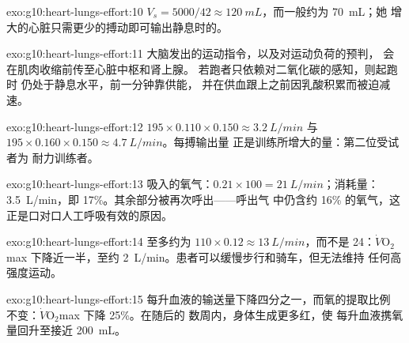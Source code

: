 \begin{solution}{exo:g10:heart-lungs-effort:10}
$V_s = 5000/42 \approx \qty{120}{mL}$，而一般约为 \qty{70}{mL}；她
增大的心脏只需更少的搏动即可输出静息时的。
\end{solution}

\begin{solution}{exo:g10:heart-lungs-effort:11}
大脑发出的运动指令，以及对运动负荷的预判，
会在肌肉收缩前传至心脏中枢和肾上腺。
若跑者只依赖对二氧化碳的感知，则起跑时
仍处于静息水平，前一分钟靠供能，
并在供血跟上之前因乳酸积累而被迫减速。
\end{solution}

\begin{solution}{exo:g10:heart-lungs-effort:12}
$195 \times 0.110 \times 0.150 \approx \qty{3.2}{L/min}$ 与
$195 \times 0.160 \times 0.150 \approx \qty{4.7}{L/min}$。每搏输出量
正是训练所增大的量：第二位受试者为
耐力训练者。
\end{solution}

\begin{solution}{exo:g10:heart-lungs-effort:13}
吸入的氧气：$0.21 \times 100 = \qty{21}{L/min}$；消耗量：
\qty{3.5}{L/min}，即 17\%。其余部分被再次呼出——呼出气
中仍含约 16\% 的氧气，这
正是口对口人工呼吸有效的原因。
\end{solution}

\begin{solution}{exo:g10:heart-lungs-effort:14}
至多约为 $110 \times 0.12 \approx \qty{13}{L/min}$，而不是
24：$\dot V\!\mathrm{O_2}$max 下降近一半，至约
\qty{2}{L/min}。患者可以缓慢步行和骑车，但无法维持
任何高强度运动。
\end{solution}

\begin{solution}{exo:g10:heart-lungs-effort:15}
每升血液的输送量下降四分之一，而氧的提取比例
不变：$\dot V\!\mathrm{O_2}$max 下降 25\%。在随后的
数周内，身体生成更多红，使
每升血液携氧量回升至接近 \qty{200}{mL}。
\end{solution}

